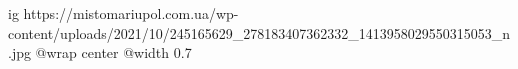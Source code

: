  
 
 
 
 

\ifcmt
  ig https://mistomariupol.com.ua/wp-content/uploads/2021/10/245165629_278183407362332_1413958029550315053_n.jpg
  @wrap center
  @width 0.7
\fi
